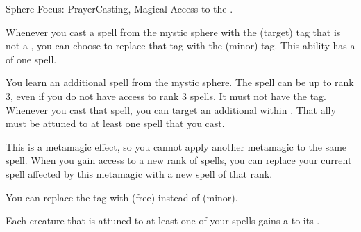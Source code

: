   \begin{magicalfeat}{Sphere Focus: Prayer}{Casting, Magical}
    \featpre Access to the  .

     Whenever you cast a spell from the  mystic sphere with the  (target) tag that is not a , you can choose to replace that tag with the  (minor) tag.
    This ability has a  of one spell.

     You learn an additional spell from the  mystic sphere.
    The spell can be up to rank 3, even if you do not have access to rank 3 spells.
    It must not have the \atAttune tag.
    Whenever you cast that spell, you can target an additional  within \medrange.
    That ally must be attuned to at least one  spell that you cast.

    This is a metamagic effect, so you cannot apply another metamagic to the same spell.
    When you gain access to a new rank of spells, you can replace your current spell affected by this metamagic with a new spell of that rank.

     You can replace the \atAttune tag with  (free) instead of  (minor).

     Each creature that is attuned to at least one of your  spells gains a   to its .
  \end{magicalfeat}

